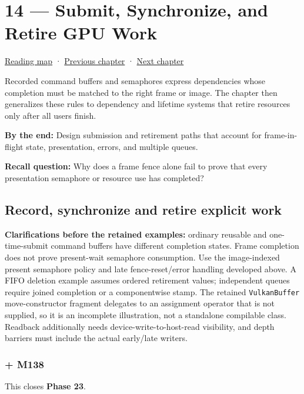 \hypertarget{01-foundations-i-ch014}{}
\section{14 --- Submit, Synchronize, and Retire GPU Work}\label{submit-synchronize-and-retire-gpu-work}

\href{Chapter\%20Edition/01\%20-\%20Computing\%20Foundations/00\%20-\%20Reading\%20Map}{Reading map} · \hyperref[01-foundations-i-ch013]{Previous chapter} · \hyperref[01-foundations-i-ch015]{Next chapter}

Recorded command buffers and semaphores express dependencies whose completion must be matched to the right frame or image. The chapter then generalizes these rules to dependency and lifetime systems that retire resources only after all users finish.

\textbf{By the end:} Design submission and retirement paths that account for frame-in-flight state, presentation, errors, and multiple queues.

\textbf{Recall question:} Why does a frame fence alone fail to prove that every presentation semaphore or resource use has completed?

\subsection{Record, synchronize and retire explicit work}\label{record-synchronize-and-retire-explicit-work}

\textbf{Clarifications before the retained examples:} ordinary reusable and one-time-submit command buffers have different completion states. Frame completion does not prove present-wait semaphore consumption. Use the image-indexed present semaphore policy and late fence-reset/error handling developed above. A FIFO deletion example assumes ordered retirement values; independent queues require joined completion or a componentwise stamp. The retained \texttt{VulkanBuffer} move-constructor fragment delegates to an assignment operator that is not supplied, so it is an incomplete illustration, not a standalone compilable class. Readback additionally needs device-write-to-host-read visibility, and depth barriers must include the actual early/late writers.

\subsubsection{+ M138}\label{m138}

This closes \textbf{Phase 23}.

